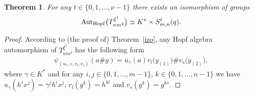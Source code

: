 \documentclass[10pt,a4paper]{amsart}
\numberwithin{equation}{section}
\newtheorem{Theorem}{Theorem}[section]
\begin{document}
\begin{Theorem}\label{graut} For any $t \in \{0, 1,\dots, \nu - 1\}$ there exists an isomorphism of groups
\begin{gather*}
{\rm Aut} _{\rm Hopf}\big(T_{nm^{2}}^ {\xi^{t}}\big) \simeq K^{*}\times S^{t}_{m, n}(q).
\end{gather*}
\end{Theorem}
\begin{proof} According to (the proof of) Theorem~\ref{izo}, any Hopf algebra automorphism of $T_{nm^{2}}^ {\xi^{t}}$ has the following form
\begin{gather*}
\psi_{(u_{\gamma}, \varepsilon, r_{l}, v_{s})}(a \# y) = u_{\gamma}(a) r_{l}\big(y_{(1)}\big) \# v_{s}\big(y_{(2)}\big),
\end{gather*}
where $\gamma \in K^{*}$ and for any $i, j \in \{0, 1,\dots, m-1\}$, $k \in \{0, 1,\dots, n-1\}$ we have $u_{\gamma}(h^{i}x^{j}) = \gamma^{j}h^{i}x^{j}$, $r_{l}(g^{k}) = h^{kl}$ and $v_{s}(g^{k}) = g^{ks}$.


\end{proof}
\end{document}
